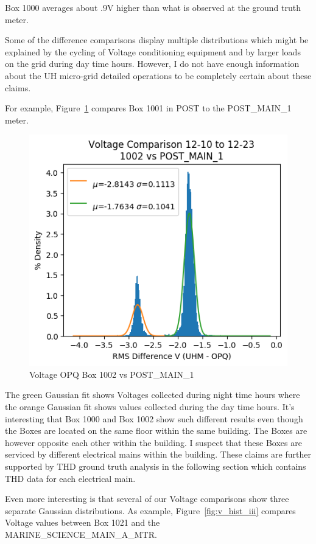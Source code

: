 Box 1000 averages about .9V higher than what is observed at the ground truth meter.

Some of the difference comparisons display multiple distributions which might be explained by the cycling of Voltage conditioning equipment and by larger loads on the grid during day time hours. However, I do not have enough information about the UH micro-grid detailed operations to be completely certain about these claims.

For example, Figure~\ref{fig:v_hist_ii} compares Box 1001 in POST to the POST\_MAIN\_1 meter.

\begin{figure}[H]
    \centering
    \includegraphics[width=0.75\linewidth]{figures/v_hist_1002_POST_MAIN_1.png}
    \caption{Voltage OPQ Box 1002 vs POST\_MAIN\_1}
    \label{fig:v_hist_ii}
\end{figure}

The green Gaussian fit shows Voltages collected during night time hours where the orange Gaussian fit shows values collected during the day time hours. It's interesting that Box 1000 and Box 1002 show such different results even though the Boxes are located on the same floor within the same building. The Boxes are however opposite each other within the building. I suspect that these Boxes are serviced by different electrical mains within the building. These claims are further supported by THD ground truth analysis in the following section which contains THD data for each electrical main.

Even more interesting is that several of our Voltage comparisons show three separate Gaussian distributions. As example, Figure~\ref{fig:v_hist_iii} compares Voltage values between Box 1021 and the MARINE\_SCIENCE\_MAIN\_A\_MTR.

